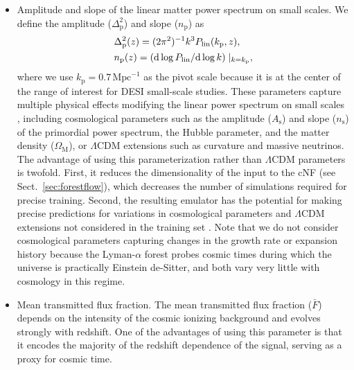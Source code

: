 \documentclass[longauth]{aa}
\newcommand{\lyaf}{Lyman-$\alpha$ forest\xspace}
\newcommand{\mflux}{\ensuremath{\bar{F}}\xspace}
\begin{document}
\begin{itemize}
    \item Amplitude and slope of the linear matter power spectrum on small scales. We define the amplitude ($\Delta^2_\mathrm{p}$) and slope ($n_\mathrm{p}$) as
    \begin{align}
        \label{eq:amplitude}
        & \Delta_\mathrm{p}^2(z) = (2\pi^2)^{-1} k^3 P_{\rm lin} (k_\mathrm{p}, z),\\
        \label{eq:slope}
        & n_\mathrm{p}(z) = \left(\mathrm{d}\log P_{\rm lin} / \mathrm{d}\log k\right)\mid_{k = k_\mathrm{p}},
    \end{align}
    where we use $k_\mathrm{p} = 0.7\,\mathrm{Mpc}^{-1}$ as the pivot scale because it is at the center of the range of interest for DESI small-scale studies. These parameters capture multiple physical effects modifying the linear power spectrum on small scales \citep[see][for a detailed discussion]{Pedersen2021}, including cosmological parameters such as the amplitude ($A_\mathrm{s}$) and slope ($n_\mathrm{s}$) of the primordial power spectrum, the Hubble parameter, and the matter density ($\Omega_\mathrm{M}$), or $\Lambda$CDM extensions such as curvature and massive neutrinos. The advantage of using this parameterization rather than $\Lambda$CDM parameters is twofold. First, it reduces the dimensionality of the input to the cNF (see Sect.~\ref{sec:forestflow}), which decreases the number of simulations required for precise training. Second, the resulting emulator has the potential for making precise predictions for variations in cosmological parameters and $\Lambda$CDM extensions not considered in the training set \citep[][]{Pedersen2021, pedersen2023CompressingCosmologicalInformation, cabayol-garcia2023NeuralNetworkEmulator}. Note that we do not consider cosmological parameters capturing changes in the growth rate or expansion history because the \lyaf probes cosmic times during which the universe is practically Einstein de-Sitter, and both vary very little with cosmology in this regime.

    \item Mean transmitted flux fraction. The mean transmitted flux fraction (\mflux) depends on the intensity of the cosmic ionizing background and evolves strongly with redshift. One of the advantages of using this parameter is that it encodes the majority of the redshift dependence of the signal, serving as a proxy for cosmic time.


\end{itemize}
\end{document}

